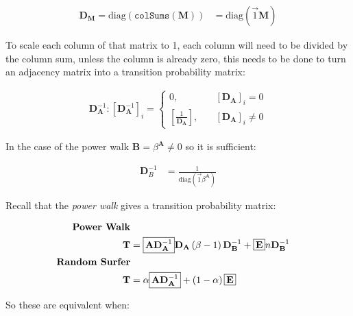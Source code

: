 \documentclass[11pt]{report}
\begin{document}
\begin{align}
    \mathbf{D}_{\mathbf{M}} = \mathrm{diag}\left( \mathtt{colSums} \left( \mathbf{M} \right) \right) &= \mathrm{diag} \left( \vec{1} \mathbf{M} \right)
\end{align}


To scale each column of that matrix to 1, each column will need to be divided by the column sum, unless the column is already zero, this needs to be done to turn an adjacency matrix into a transition probability matrix:

\begin{align}
    \mathbf{D}_{\mathbf{A}} ^{- 1} :  \left[     \mathbf{D}_{\mathbf{A}} ^{- 1}  \right]_i =
    \begin{cases}
	0 ,& \quad \left[ \mathbf{D}_{\mathbf{A}} \right]_i = 0 \\
	\left[ \frac{1}{\mathbf{D}_{\mathbf{A}}} \right] ,& \enspace \enspace \left[ \mathbf{D}_{\mathbf{A}} \right]_i \neq 0
    \end{cases}
\end{align}

In the case of the power walk \(\mathbf{B}= \beta^{\mathbf{A}} \neq 0\) so it is sufficient:

\begin{align}
	\mathbf{D}_{B}^{- 1} &= \frac{1}{\mathrm{diag}\left( \vec{1}\beta^{\mathbf{A}} \right)} 
\end{align}



Recall that the \emph{power walk} gives a transition probability matrix:

\begin{align}
    \text{\textbf{Power Walk}} \nonumber \\
\mathbf{T} &= \text{\fboxsep=.2em\fbox{$\mathbf{A}\mathbf{D}_{\mathbf{A}}^{- 1}$}}  \mathbf{D}_{\mathbf{A}} \left( \beta - 1 \right) \mathbf{D}_{\mathbf{B}}^{- 1} + \text{\fboxsep=.2em\fbox{$\mathbf{E}$}} n \mathbf{D}_{\mathbf{B}}^{- 1}  \label{eq:pwbx}\\
    \text{\textbf{Random Surfer}} \nonumber \\
    \mathbf{T} &= \alpha \text{\fboxsep=.2em\fbox{$\mathbf{A}\mathbf{D}_{\mathbf{A}}^{- 1}$}}  + \left( 1-\alpha \right) \text{\fboxsep=.2em\fbox{$\mathbf{E}$}}
\end{align}

So these are equivalent when:
\end{document}
